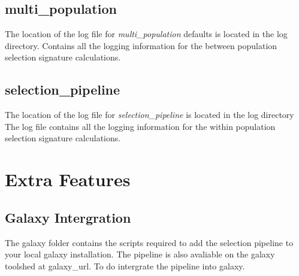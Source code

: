 \documentclass[a4paper,10pt]{article}
\begin{document}
\subsection{multi\_population}
The location of the log file for  \emph{multi\_population} defaults is located in the log directory. Contains all the logging information for the between population selection signature calculations.
\subsection{selection\_pipeline}
The location of the log file for \emph{selection\_pipeline} is located in the log directory The log file contains all the logging information for the within population selection signature calculations.

\section{Extra Features}

\subsection{Galaxy Intergration}
The galaxy folder contains the scripts required to add the selection pipeline to your local galaxy installation. The pipeline is also avaliable on the galaxy toolshed at galaxy\_url. To do intergrate the pipeline into galaxy.
\end{document}
